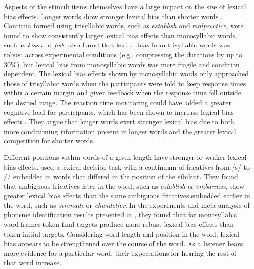 Aspects of the stimuli items themselves have a large impact on the size of lexical bias effects.
Longer words show stronger lexical bias than shorter words \citep{Pitt2006}.  
Continua formed using trisyllabic words, such as \emph{establish} and \emph{malpractice}, were found to show consistently larger lexical bias effects than monosyllabic words, such as \emph{kiss} and \emph{fish}.  
\citet{Pitt2006} also found that lexical bias from trisyllabic words was robust across experimental conditions (e.g., compressing the durations by up to 30\%), but lexical bias from monosyllabic words was more fragile and condition dependent.
The lexical bias effects shown by monosyllabic words only approached those of trisyllabic words when the participants were told to keep response times within a certain margin and given feedback when the response time fell outside the desired range.
The reaction time monitoring could have added a greater cognitive load for participants, which has been shown to increase lexical bias effects \citep{Mattys2011}.
They argue that longer words exert stronger lexical bias due to both more conditioning information present in longer words and the greater lexical competition for shorter words.

Different positions within words of a given length have stronger or weaker lexical bias effects.
\citet{Pitt2012} used a lexical decision task with a continuum of fricatives from /s/ to /\textesh/ embedded in words that differed in the position of the sibilant.  
They found that ambiguous fricatives later in the word, such as \emph{establish} or \emph{embarrass}, show greater lexical bias effects than the same ambiguous fricatives embedded earlier in the word, such as \emph{serenade} or \emph{chandelier}.
In the experiments and meta-analysis of phoneme identification results presented in \citet{Pitt1993}, they found that for monosyllabic word frames token-final targets produce more robust lexical bias effects than token-initial targets.
Considering word length and position in the word, lexical bias appears to be strengthened over the course of the word.
As a listener hears more evidence for a particular word, their expectations for hearing the rest of that word increase.

